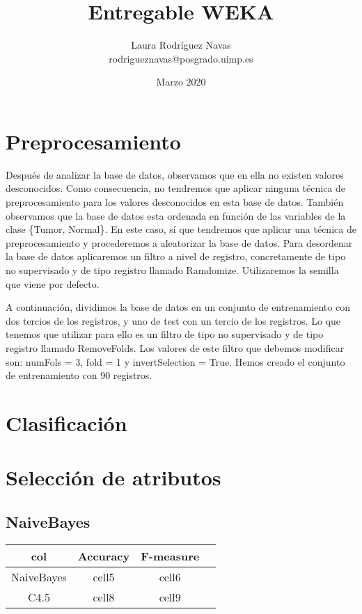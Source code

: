 \documentclass{article}
\title{Entregable WEKA}
\author{Laura Rodríguez Navas \\ rodrigueznavas@posgrado.uimp.es}
\date{Marzo 2020}
\begin{document}
\maketitle

\section*{Preprocesamiento}

Después de analizar la base de datos, observamos que en ella no existen valores desconocidos. Como consecuencia, no tendremos que aplicar ninguna técnica de preprocesamiento para los valores desconocidos en esta base de datos. También observamos que la base de datos esta ordenada en función de las variables de la clase \{Tumor, Normal\}. En este caso, sí que tendremos que aplicar una técnica de preprocesamiento y procederemos a aleatorizar la base de datos. Para desordenar la base de datos aplicaremos un filtro a nivel de registro, concretamente de tipo no supervisado y de tipo registro llamado Ramdomize. Utilizaremos la semilla que viene por defecto. 

A continuación, dividimos la base de datos en un conjunto de entrenamiento con dos tercios de los registros, y uno de test con un tercio de los registros. Lo que tenemos que utilizar para ello es un filtro de tipo no supervisado y de tipo registro llamado RemoveFolds. Los valores de este filtro que debemos modificar son: numFols = 3, fold = 1 y invertSelection = True. Hemos creado el conjunto de entrenamiento con 90 registros.

\section*{Clasificación}

\section*{Selección de atributos}

\subsection*{NaiveBayes}

\begin{center}
	\begin{tabular}{ |c|c|c|c| } 
		\hline
		col & Accuracy & F-measure \\
		\hline
		NaiveBayes& cell5 & cell6 \\ 
		C4.5 & cell8 & cell9 \\ 
		\hline
	\end{tabular}
\end{center}
\end{document}
